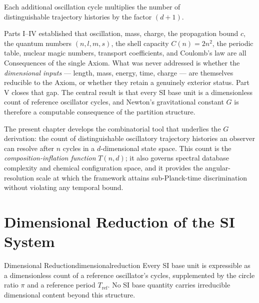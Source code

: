 
\epigraph{%
  Each additional oscillation cycle multiplies the number of\\
  distinguishable trajectory histories by the factor $(d+1)$.%
}{}

\noindent
Parts I--IV established that oscillation, mass, charge, the propagation
bound $c$, the quantum numbers $(n,l,m,s)$, the shell capacity $C(n)=2n^{2}$,
the periodic table, nuclear magic numbers, transport coefficients, and
Coulomb's law are all Consequences of the single Axiom.
What was never addressed is whether the \emph{dimensional inputs} --- length,
mass, energy, time, charge --- are themselves reducible to the Axiom, or
whether they retain a genuinely exterior status.
Part V closes that gap.
The central result is that every SI base unit is a dimensionless count of
reference oscillator cycles, and Newton's gravitational constant $G$ is
therefore a computable consequence of the partition structure.

The present chapter develops the combinatorial tool that underlies the $G$
derivation: the count of distinguishable oscillatory trajectory histories an
observer can resolve after $n$ cycles in a $d$-dimensional state space.
This count is the \emph{composition-inflation function} $T(n,d)$; it also
governs spectral database complexity and chemical configuration space, and
it provides the angular-resolution scale at which the framework attains
sub-Planck-time discrimination without violating any temporal bound.

\section{Dimensional Reduction of the SI System}
\label{sec:ch19-dimreduction}
\label{sec:dimensionalreduction}

\begin{consequence}{Dimensional Reduction}{dimensionalreduction}
  Every SI base unit is expressible as a dimensionless count of a reference
  oscillator's cycles, supplemented by the circle ratio $\pi$ and a reference
  period $T_{\mathrm{ref}}$.
  No SI base quantity carries irreducible dimensional content beyond this
  structure.
\end{consequence}

